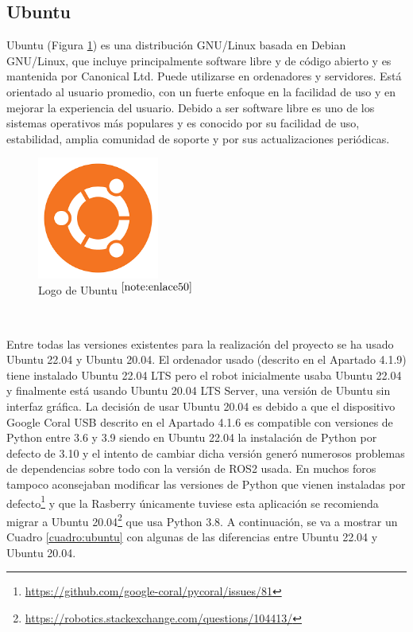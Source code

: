 \setcounter{footnote}{49} %


\subsection{Ubuntu}

Ubuntu (Figura \ref{fig:ubuntu}) es una distribución GNU/Linux basada en Debian GNU/Linux, que incluye principalmente software libre y de código abierto y es mantenida por Canonical Ltd. Puede utilizarse en ordenadores y servidores. Está orientado al usuario promedio, con un fuerte enfoque en la facilidad de uso y en mejorar la experiencia del usuario. Debido a ser software libre es uno de los sistemas operativos más populares y es conocido por su facilidad de uso, estabilidad, amplia comunidad de soporte y por sus actualizaciones periódicas.

\begin{figure} [h!]
	\begin{center}
		\includegraphics[width=4cm]{figs/ubuntu.png}
	\end{center}
	\caption{Logo de Ubuntu $^{\ref{note:enlace50}}$} 
	\label{fig:ubuntu}
\end{figure}\

\setcounter{footnote}{50} %

Entre todas las versiones existentes para la realización del proyecto se ha usado Ubuntu 22.04 y Ubuntu 20.04. El ordenador usado (descrito en el Apartado 4.1.9) tiene instalado Ubuntu 22.04 \ac{LTS} pero el robot inicialmente usaba Ubuntu 22.04 y finalmente está usando Ubuntu 20.04 \acs{LTS} Server, una versión de Ubuntu sin interfaz gráfica. La decisión de usar Ubuntu 20.04 es debido a que el dispositivo Google Coral USB descrito en el Apartado 4.1.6 es compatible con versiones de Python entre 3.6 y 3.9 siendo en Ubuntu 22.04 la instalación de Python por defecto de 3.10 y el intento de cambiar dicha versión generó numerosos problemas de dependencias sobre todo con la versión de ROS2 usada. En muchos foros tampoco aconsejaban modificar las versiones de Python que vienen instaladas por defecto\footnote{\url{https://github.com/google-coral/pycoral/issues/81}} y que la Rasberry únicamente tuviese esta aplicación se recomienda migrar a Ubuntu 20.04\footnote{\url{https://robotics.stackexchange.com/questions/104413/}} que usa Python 3.8. A continuación, se va a mostrar un Cuadro \ref{cuadro:ubuntu} con algunas de las diferencias entre Ubuntu 22.04 y Ubuntu 20.04.

